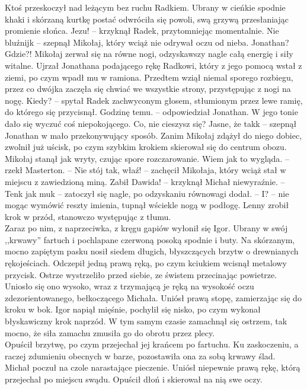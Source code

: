 \documentclass[../MAIN.tex]{subfiles}
\begin{document}
Ktoś przeskoczył nad leżącym bez ruchu Radkiem. Ubrany w cieńkie spodnie khaki i skórzaną kurtkę postać odwróciła się powoli, swą grzywą przesłaniając promienie słońca.
\sx Jezu! -- krzyknął Radek, przytomniejąc momentalnie.
\xx Nie bluźnij\3k -- szepnął Mikołaj, który wciąż nie odrywał oczu od nieba.
\xx Jonathan?
\xx Gdzie?!
\qd
Mikołaj zerwał się na równe nogi, odzyskawszy nagle całą energię i siły witalne. Ujrzał Jonathana podającego rękę Radkowi, który z jego pomocą wstał z ziemi, po czym wpadł mu w ramiona. Przedtem wziął niemal sporego rozbiegu, przez co dwójka zaczęła się chwiać we wszystkie strony, przystępując z nogi na nogę.
\sx Kiedy? -- spytał Radek zachwyconym głosem, stłumionym przez lewe ramię, do którego się przycisnął.
\xx Godzinę temu. -- odpowiedział Jonathan. W jego tonie dało się wyczuć coś niepokojącego.
\xx Co, nie cieszysz się?
\xx Jasne, że tak\3k -- szepnął Jonathan w mało przekonywujący sposób. Zanim Mikołaj zdążył do niego dobiec, zwolnił już uścisk, po czym szybkim krokiem skierował się do centrum obozu. Mikołaj stanął jak wryty, czując spore rozczarowanie.
\xx Wiem jak to wygląda. -- rzekł Masterton. -- Nie stój tak, właź! -- zachęcił Mikołaja, który wciąż stał w miejscu z zawiedzioną miną.
\qd\dd\sx
Zabił Dawida! -- krzyknął Michał niewyraźnie. -- Ten\3k jak mu\3k -- zatoczył się nagle, po odzyskaniu równowagi dodał. -- I? -- nie mogąc wymówić reszty imienia, tupnął wściekle nogą w podłogę.
\qd
Lenny zrobił krok w przód, stanowczo występując z tłumu.\\
Zaraz po nim, z naprzeciwka, z kręgu gapiów wyłonił się Igor. Ubrany w swój ,,krwawy'' fartuch i pochlapane czerwoną posoką spodnie i buty. Na skórzanym, mocno zapiętym pasku nosił siedem długich, błyszczących brzytw o drewnianych rękojeściach. Odczepił jedną prawą ręką, po czym kciukiem wcisnął metalowy przycisk. Ostrze wystrzeliło przed siebie, ze świstem przecinając powietrze. Uniosło się ono wysoko, wraz z trzymającą je ręką na wysokość oczu zdezorientowanego, bełkoczącego Michała. Uniósł prawą stopę, zamierzając się do kroku w bok.
Igor napiął mięśnie, pochylił się nisko, po czym wykonał błyskawiczny krok naprzód. W tym samym czasie zamachnął się ostrzem, tak mocno, że siła zamachu zmusiła go do obrotu przez plecy.\\
Opuścił brzytwę, po czym przejechał jej krańcem po fartuchu. Ku zaskoczeniu, a raczej zdumieniu obecnych w barze, pozostawiła ona za sobą krwawy ślad.\\
Michał poczuł na czole narastające pieczenie. Uniósł niepewnie prawą rękę, którą przejechał po miejscu swądu. Opuścił dłoń i skierował na nią swe oczy.\\
\end{document}
